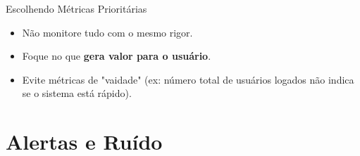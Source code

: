 \documentclass[9pt]{beamer}
\begin{document}
\begin{frame}{Escolhendo Métricas Prioritárias}
\begin{itemize}
    \item Não monitore tudo com o mesmo rigor.
    \item Foque no que \textbf{gera valor para o usuário}.
    \item Evite métricas de "vaidade" (ex: número total de usuários logados não indica se o sistema está rápido).
\end{itemize}
\end{frame}

\section{Alertas e Ruído}
\end{document}
